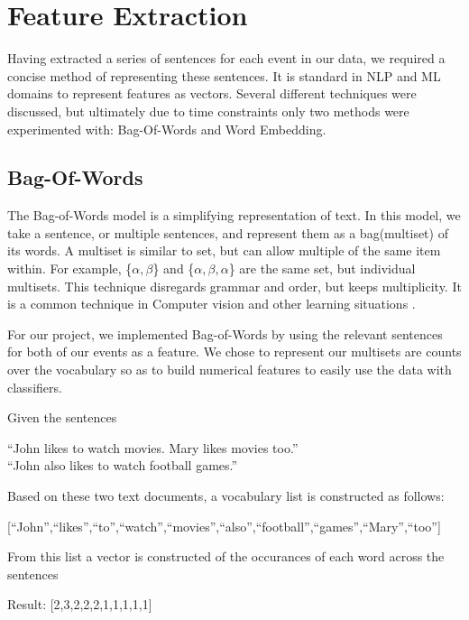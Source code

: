 \documentclass[bsc,frontabs,twoside,singlespacing,parskip,deptreport]{infthesis}     %
\begin{document}
\section{Feature Extraction}\label{sec:representation}
Having extracted a series of sentences for each event in our data, we required a concise method
of representing these sentences. It is standard in NLP and ML domains to represent features as vectors.
Several different techniques were discussed, but ultimately due to time constraints only two methods were
experimented with: Bag-Of-Words and Word Embedding.
\subsection{Bag-Of-Words}
The Bag-of-Words model is a simplifying representation of text.
In this model, we take a sentence, or multiple sentences, and represent them as a bag(multiset) of its words.
A multiset is similar to set, but can allow multiple of the same item within.
For example, \{$\alpha,\beta$\} and \{$\alpha,\beta,\alpha$\} are the same set, but individual multisets.
This technique disregards grammar and order, but keeps multiplicity. It is a common technique in Computer vision
and other learning situations \cite{sivic2009efficient}.

For our project, we implemented Bag-of-Words by using the relevant sentences for both of our events as a feature.
We chose to represent our multisets are counts over the vocabulary so as to build numerical features to easily
use the data with classifiers.
\begin{tcolorbox}[width=\textwidth,
                  interior hidden,
                  boxsep=10pt,
                  left=0pt,
                  right=0pt,
                  top=2pt,
                  ]%
  Given the sentences \vspace{0.5em}\\
  \begin{center}``John likes to watch movies. Mary likes movies too.''\\
  ``John also likes to watch football games.''\vspace{1em}\\
   \end{center}
    Based on these two text documents, a vocabulary list is constructed as follows:\vspace{1em}\\
    \begin{center}
  [``John'',``likes'',``to'',``watch'',``movies'',``also'',``football'',``games'',``Mary'',``too'']\vspace{1em}\\
\end{center}
    From this list a vector is constructed of the occurances
    of each word across the sentences\vspace{1em}\\
 \begin{center} 
  Result: [2,3,2,2,2,1,1,1,1,1]
\end{center}
\end{tcolorbox}
\end{document}
